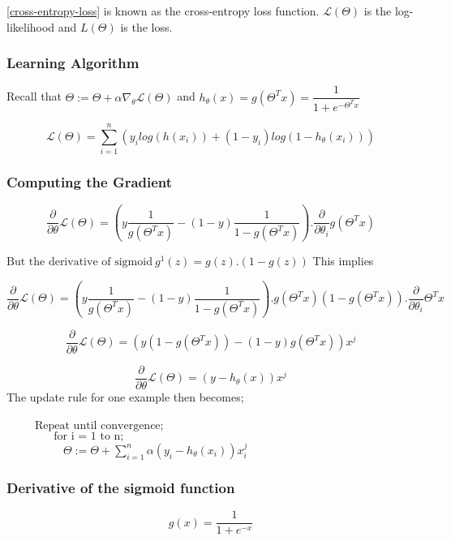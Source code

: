 \documentclass[12pt,a4paper,titlepage,landscape]{book}
\begin{document}
	\eqref{cross-entropy-loss} is known as the cross-entropy loss function. $\mathcal{L}(\Theta)$ is the log-likelihood and $L(\Theta)$ is the loss.
	
	\subsubsection{Learning Algorithm}
	Recall that $\Theta := \Theta + \alpha\nabla_\theta\mathcal{L}(\Theta)$ and $h_\theta(x) = g(\Theta^Tx) = \dfrac{1}{1+e^{-\Theta^Tx}}$
	
	$$
	\mathcal{L}(\Theta) = \sum_{i=1}^{n}\left(y_ilog(h(x_i)) + (1-y_i)log(1-h_\theta(x_i))\right)
	$$
	
	\subsubsection{Computing the Gradient}
	$$\dfrac{\partial}{\partial\theta}\mathcal{L}(\Theta) = \left(y\dfrac{1}{g(\Theta^Tx)} - (1-y)\dfrac{1}{1-g(\Theta^Tx)}\right).\dfrac{\partial}{\partial\theta_i}g(\Theta^Tx)$$
	
	$\text{But the derivative of sigmoid}~ g^1(z) = g(z).(1-g(z)) $ This implies
	
	$$\dfrac{\partial}{\partial\theta}\mathcal{L}(\Theta) = \left(y\dfrac{1}{g(\Theta^Tx)} - (1-y)\dfrac{1}{1-g(\Theta^Tx)}\right).g\left(\Theta^Tx\right)\left(1-g(\Theta^Tx)\right).\dfrac{\partial}{\partial\theta_i}\Theta^Tx$$
	
	$$\dfrac{\partial}{\partial\theta}\mathcal{L}(\Theta) = \left(y(1-g(\Theta^Tx)) - (1-y)g(\Theta^Tx)\right)x^j$$
	
	$$\dfrac{\partial}{\partial\theta}\mathcal{L}(\Theta) = (y-h_\theta(x))x^j$$
	The update rule for one example then becomes; \\\\
	${}\hspace{30pt} \text{Repeat until convergence;} $\\
	${}\hspace{50pt} \text{for i = 1 to n;} $\\
	${}\hspace{60pt} \Theta := \Theta + \sum_{i=1}^{n}\alpha (y_i - h_\theta(x_i))x_i^j$\\
	
	\subsubsection{Derivative of the sigmoid function}
	$$g(x) = \dfrac{1}{1+e^{-x}}$$
	
\end{document}
